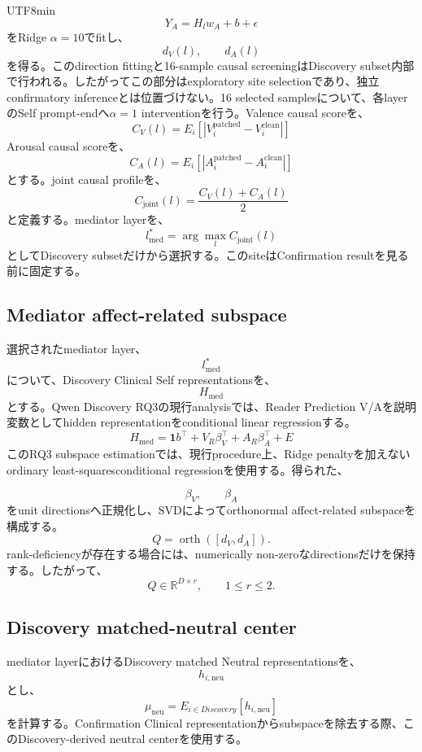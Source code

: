 \documentclass{article} %
\begin{document}
\begin{CJK*}{UTF8}{min}
\[
Y_A
=
H_lw_A+b+\epsilon
\]
をRidge \(\alpha=10\)でfitし、
\[
d_V(l),
\qquad
d_A(l)
\]
を得る。このdirection fittingと16-sample causal screeningはDiscovery subset内部で行われる。したがってこの部分はexploratory site selectionであり、独立confirmatory inferenceとは位置づけない。16 selected samplesについて、各layerのSelf prompt-endへ\(\alpha=1\) interventionを行う。Valence causal scoreを、
\[
C_V(l)
=
E_i
[
|
V_i^{\mathrm{patched}}
-
V_i^{\mathrm{clean}}
|
]
\]
Arousal causal scoreを、
\[
C_A(l)
=
E_i
[
|
A_i^{\mathrm{patched}}
-
A_i^{\mathrm{clean}}
|
]
\]
とする。joint causal profileを、
\[
C_{\mathrm{joint}}(l)
=
\frac{
C_V(l)+C_A(l)
}{2}
\]
と定義する。mediator layerを、
\[
l_{\mathrm{med}}^{*}
=
\arg\max_l
C_{\mathrm{joint}}(l)
\]
としてDiscovery subsetだけから選択する。このsiteはConfirmation resultを見る前に固定する。


\subsection{Mediator affect-related subspace}

選択されたmediator layer、
\[
l_{\mathrm{med}}^{*}
\]
について、Discovery Clinical Self representationsを、
\[
H_{\mathrm{med}}
\]
とする。Qwen Discovery RQ3の現行analysisでは、Reader Prediction V/Aを説明変数としてhidden representationをconditional linear regressionする。
\[
H_{\mathrm{med}}
=
\mathbf{1}b^\top
+
V_R\beta_V^\top
+
A_R\beta_A^\top
+
E
\]
このRQ3 subspace estimationでは、現行procedure上、Ridge penaltyを加えないordinary least-squaresconditional regressionを使用する。得られた、

\[
\beta_V,
\qquad
\beta_A
\]
をunit directionsへ正規化し、SVDによってorthonormal affect-related subspaceを構成する。
\[
Q
=
\operatorname{orth}
(
[d_V,d_A]
).
\]
rank-deficiencyが存在する場合には、numerically non-zeroなdirectionsだけを保持する。したがって、
\[
Q
\in
\mathbb{R}^{D\times r},
\qquad
1\le r\le2.
\]


\subsection{Discovery matched-neutral center}

mediator layerにおけるDiscovery matched Neutral representationsを、
\[
h_{i,\mathrm{neu}}
\]
とし、
\[
\mu_{\mathrm{neu}}
=
E_{i\in Discovery}
[
h_{i,\mathrm{neu}}
]
\]
を計算する。Confirmation Clinical representationからsubspaceを除去する際、このDiscovery-derived neutral centerを使用する。



\end{CJK*}
\end{document}
